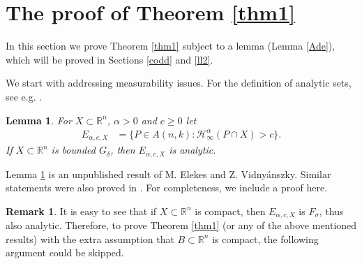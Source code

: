 \documentclass[a4paper]{amsart}
\newtheorem{lemma}[theorem]{Lemma}
\theoremstyle{definition} \newtheorem{remark}[theorem]{Remark}
\def\rr{{\mathbb R}}
\def\R{{\mathbb R}}
\def\su{\subset}
\def\al{\alpha}
\def\hau{\mathcal{H}}
\begin{document}
\section{The proof of Theorem \ref{thm1}}
\label{bas}

In this section we prove Theorem \ref{thm1} subject to a lemma (Lemma \ref{Ade}), which will be proved in Sections \ref{codd} and \ref{ll2}. 

We start with addressing measurability issues. 
For the definition of analytic sets, see e.g. \cite{Fr}. 


\def\phi{\varphi}
\begin{lemma}
\label{use}
For $X\subset \R^n$, $\al>0$ and $c \geq 0$ let 
\begin{align*}
E_{{\alpha},c,X} & =\{P \in A(n,k) \colon\hau^\alpha_{\infty}(P\cap X) > c \}.
\end{align*}
If $X\subset \R^n$ is bounded $G_\delta$,
then  $E_{\alpha,c,X}$ is analytic. 
\end{lemma}

Lemma \ref{use} is an unpublished result of M. Elekes and Z. Vidny\'anszky. Similar statements were also proved in \cite{De}. 
For completeness, we include a proof here.

\begin{remark}
It is easy to see that if $X\subset \R^n$ is compact, then $E_{\alpha,c,X}$ is $F_{\sigma}$, thus also analytic. 
Therefore, to prove Theorem \ref{thm1} (or any of the above mentioned results) with the extra assumption that $B \su \rr^n$ is compact, the following argument could be skipped. 
\end{remark}
\end{document}
